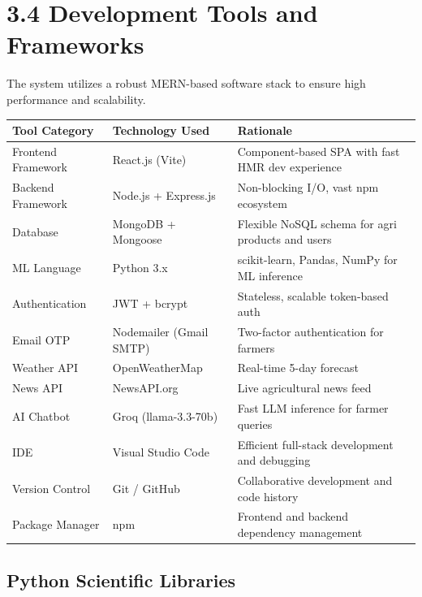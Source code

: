 \documentclass[12pt,a4paper]{report}
\begin{document}
\newpage

\section{3.4 Development Tools and Frameworks}

The system utilizes a robust MERN-based software stack to ensure high performance and scalability.

\begin{table}[h!]
\centering
\begin{tabular}{|l|l|l|}
\hline
Tool Category & Technology Used & Rationale \\ \hline
Frontend Framework & React.js (Vite) & Component-based SPA with fast HMR dev experience \\ \hline
Backend Framework & Node.js + Express.js & Non-blocking I/O, vast npm ecosystem \\ \hline
Database & MongoDB + Mongoose & Flexible NoSQL schema for agri products and users \\ \hline
ML Language & Python 3.x & scikit-learn, Pandas, NumPy for ML inference \\ \hline
Authentication & JWT + bcrypt & Stateless, scalable token-based auth \\ \hline
Email OTP & Nodemailer (Gmail SMTP) & Two-factor authentication for farmers \\ \hline
Weather API & OpenWeatherMap & Real-time 5-day forecast \\ \hline
News API & NewsAPI.org & Live agricultural news feed \\ \hline
AI Chatbot & Groq (llama-3.3-70b) & Fast LLM inference for farmer queries \\ \hline
IDE & Visual Studio Code & Efficient full-stack development and debugging \\ \hline
Version Control & Git / GitHub & Collaborative development and code history \\ \hline
Package Manager & npm & Frontend and backend dependency management \\ \hline
\end{tabular}
\end{table}

\subsection{Python Scientific Libraries}
\end{document}
